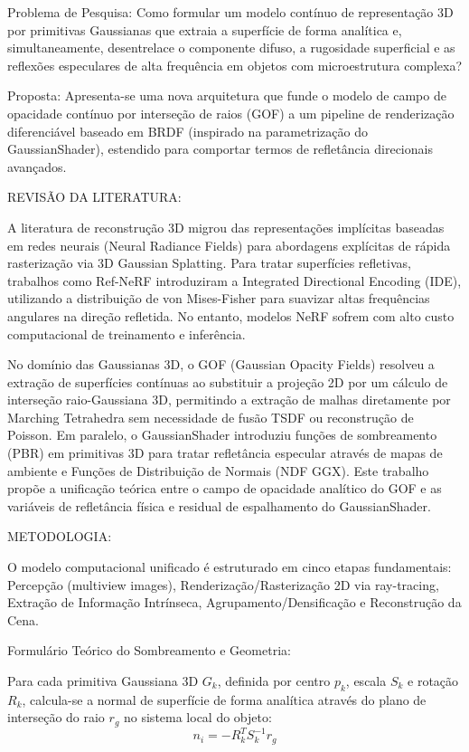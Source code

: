 \documentclass[12pt]{article}
\begin{document}
Problema de Pesquisa: Como formular um modelo contínuo de representação 3D por primitivas Gaussianas que extraia a superfície de forma analítica e, simultaneamente, desentrelace o componente difuso, a rugosidade superficial e as reflexões especulares de alta frequência em objetos com microestrutura complexa?

Proposta: Apresenta-se uma nova arquitetura que funde o modelo de campo de opacidade contínuo por interseção de raios (GOF) a um pipeline de renderização diferenciável baseado em BRDF (inspirado na parametrização do GaussianShader), estendido para comportar termos de refletância direcionais avançados.

REVISÃO DA LITERATURA:

A literatura de reconstrução 3D migrou das representações implícitas baseadas em redes neurais (Neural Radiance Fields) para abordagens explícitas de rápida rasterização via 3D Gaussian Splatting. Para tratar superfícies refletivas, trabalhos como Ref-NeRF introduziram a Integrated Directional Encoding (IDE), utilizando a distribuição de von Mises-Fisher para suavizar altas frequências angulares na direção refletida. No entanto, modelos NeRF sofrem com alto custo computacional de treinamento e inferência.

No domínio das Gaussianas 3D, o GOF (Gaussian Opacity Fields) resolveu a extração de superfícies contínuas ao substituir a projeção 2D por um cálculo de interseção raio-Gaussiana 3D, permitindo a extração de malhas diretamente por Marching Tetrahedra sem necessidade de fusão TSDF ou reconstrução de Poisson. Em paralelo, o GaussianShader introduziu funções de sombreamento (PBR) em primitivas 3D para tratar refletância especular através de mapas de ambiente e Funções de Distribuição de Normais (NDF GGX). Este trabalho propõe a unificação teórica entre o campo de opacidade analítico do GOF e as variáveis de refletância física e residual de espalhamento do GaussianShader.

METODOLOGIA:

O modelo computacional unificado é estruturado em cinco etapas fundamentais: Percepção (multiview images), Renderização/Rasterização 2D via ray-tracing, Extração de Informação Intrínseca, Agrupamento/Densificação e Reconstrução da Cena.

Formulário Teórico do Sombreamento e Geometria:

Para cada primitiva Gaussiana 3D $G_k$, definida por centro $p_k$, escala $S_k$ e rotação $R_k$, calcula-se a normal de superfície de forma analítica através do plano de interseção do raio $r_g$ no sistema local do objeto: $$n_i = -R_k^T S_k^{-1} r_g$$
\end{document}
